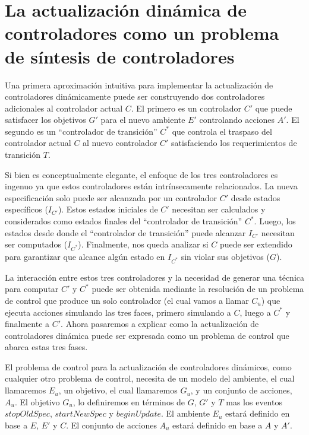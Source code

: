 \section{La actualización dinámica de controladores como un problema de síntesis de controladores}

Una primera aproximación intuitiva para implementar la actualización de controladores dinámicamente puede ser
construyendo dos controladores adicionales al controlador actual $C$. El primero es un controlador $C'$ que puede
satisfacer los objetivos $G'$ para el nuevo ambiente $E'$ controlando acciones $A'$. El segundo es un ``controlador de
transición'' $C^*$ que controla el traspaso del controlador actual $C$ al nuevo controlador $C'$ satisfaciendo los
requerimientos de transición $T$.

Si bien es conceptualmente elegante, el enfoque de los tres controladores es ingenuo ya que estos controladores están
intrínsecamente relacionados. La nueva especificación solo puede ser alcanzada por un controlador $C'$ desde estados
específicos ($I_{C'}$). Estos estados iniciales de $C'$ necesitan ser calculados y considerados como estados finales del
``controlador de transición'' $C^*$. Luego, los estados desde donde el ``controlador de transición'' puede alcanzar
$I_{C'}$ necesitan ser computados ($I_{C^*}$). Finalmente, nos queda analizar si $C$ puede ser extendido para
garantizar que alcance algún estado en $I_{C^*}$ sin violar sus objetivos ($G$).

La interacción entre estos tres controladores y la necesidad de generar una técnica para computar $C'$ y $C^*$ puede ser
obtenida mediante la resolución de un problema de control que produce un solo controlador (el cual vamos a llamar $C_u$)
que ejecuta acciones simulando las tres faces, primero simulando a $C$, luego a $C^*$ y finalmente a $C'$. Ahora
pasaremos a explicar como la actualización de controladores dinámica puede ser expresada como un problema de control que
abarca estas tres fases.

El problema de control para la actualización de controladores dinámicos, como cualquier otro problema de control,
necesita de un modelo del ambiente, el cual llamaremos $E_u$, un objetivo, el cual llamaremos $G_u$, y un conjunto de
acciones, $A_u$. El objetivo $G_u$, lo definiremos en términos de $G$, $G'$ y $T$ mas los eventos $stopOldSpec$,
$startNewSpec$ y $beginUpdate$. El ambiente $E_u$ estará definido en base a $E$, $E'$ y $C$. El conjunto de acciones
$A_u$ estará definido en base a $A$ y $A'$.

